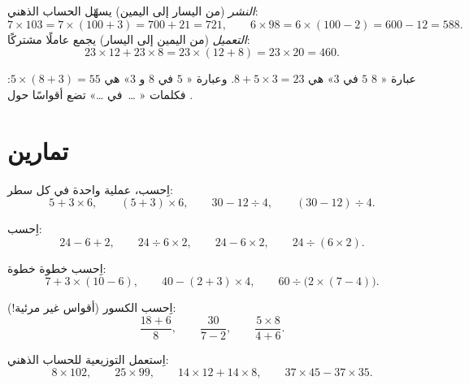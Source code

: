 \begin{example}[الاتجاهان معًا]\label{ex:g7:priorities:distributivity}
\emph{النشر} (من اليسار إلى اليمين) يسهّل الحساب الذهني:
\[
7 \times 103 = 7 \times (100 + 3) = 700 + 21 = 721,
\qquad
6 \times 98 = 6 \times (100 - 2) = 600 - 12 = 588 .
\]
\emph{التعميل} (من اليمين إلى اليسار) يجمع عاملًا مشتركًا:
\[
23 \times 12 + 23 \times 8 = 23 \times (12 + 8) = 23 \times 20 = 460 .
\]
\end{example}

\begin{example}\label{ex:g7:priorities:words}
عبارة « $8$  $5$ في $3$» هي $8 + 5 \times 3 =
23$. وعبارة « $5$ في  $8$ و $3$» هي
$5 \times (8 + 3) = 55$: فكلمات « \dots\ في 
\dots» تضع أقواسًا حول .
\end{example}

\section{تمارين}

\begin{exercise}[$\star$]\label{exo:g7:priorities:1}
اِحسب، عملية واحدة في كل سطر:
\[
5 + 3 \times 6, \qquad
(5 + 3) \times 6, \qquad
30 - 12 \div 4, \qquad
(30 - 12) \div 4 .
\]
\end{exercise}

\begin{exercise}[$\star$]\label{exo:g7:priorities:2}
اِحسب:
\[
24 - 6 + 2, \qquad
24 \div 6 \times 2, \qquad
24 - 6 \times 2, \qquad
24 \div (6 \times 2).
\]
\end{exercise}

\begin{exercise}[$\star$]\label{exo:g7:priorities:3}
اِحسب خطوة خطوة:
\[
7 + 3 \times (10 - 6), \qquad
40 - (2 + 3) \times 4, \qquad
60 \div \bigl(2 \times (7 - 4)\bigr).
\]
\end{exercise}

\begin{exercise}[$\star$]\label{exo:g7:priorities:4}
اِحسب الكسور (أقواس غير مرئية!):
\[
\frac{18 + 6}{8}, \qquad
\frac{30}{7 - 2}, \qquad
\frac{5 \times 8}{4 + 6} .
\]
\end{exercise}

\begin{exercise}[$\star$]\label{exo:g7:priorities:5}
اِستعمل التوزيعية للحساب الذهني:
\[
8 \times 102, \qquad
25 \times 99, \qquad
14 \times 12 + 14 \times 8, \qquad
37 \times 45 - 37 \times 35 .
\]
\end{exercise}

